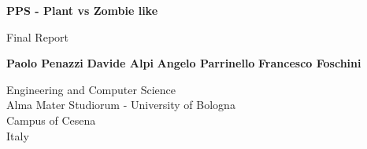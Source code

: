 
\begin{titlepage}
    \begin{center}
        \vspace*{2cm}

        \huge
        \textbf{PPS - Plant vs Zombie like}

        \vspace{1cm}

        \LARGE
        Final Report

        \vspace{2cm}

        \textbf{Paolo Penazzi}
        \vspace{1cm}
        \textbf{Davide Alpi}
        \vspace{1cm}
        \textbf{Angelo Parrinello}
        \vspace{1cm}
        \textbf{Francesco Foschini}

        \vspace{4cm}

        \vspace{2cm}

        \Large
        Engineering and Computer Science\\
        Alma Mater Studiorum - University of Bologna\\
        Campus of Cesena\\
        Italy\\

    \end{center}
\end{titlepage}